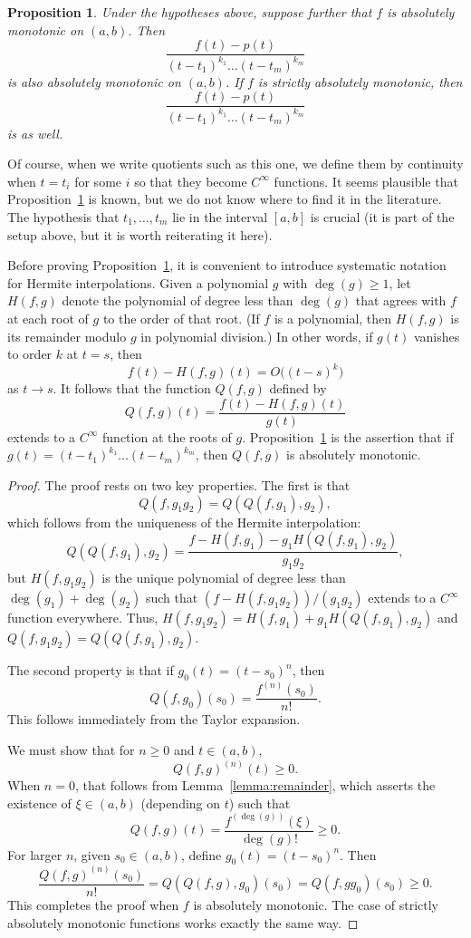 \documentclass{jams-l}
\theoremstyle{plain}
\newtheorem{proposition}[theorem]{Proposition}
\numberwithin{theorem}{section}
\theoremstyle{definition}
\numberwithin{equation}{section}
\begin{document}
\begin{proposition}\label{prop:absmonred}
Under the hypotheses above, suppose further that $f$ is absolutely
monotonic on $(a,b)$.  Then
$$
\frac{f(t)-p(t)}{(t-t_1)^{k_1}\dots (t-t_m)^{k_m}}
$$
is also absolutely monotonic on $(a,b)$.  If $f$ is strictly
absolutely monotonic, then
$$
\frac{f(t)-p(t)}{(t-t_1)^{k_1}\dots (t-t_m)^{k_m}}
$$
is as well.
\end{proposition}

Of course, when we write quotients such as this one, we define
them by continuity when $t = t_i$ for some $i$ so that they become
$C^\infty$ functions. It seems plausible that
Proposition~\ref{prop:absmonred} is known, but we do not know
where to find it in the literature. The hypothesis that
$t_1,\dots,t_m$ lie in the interval $[a,b]$ is crucial (it is part
of the setup above, but it is worth reiterating it here).

Before proving Proposition~\ref{prop:absmonred}, it is convenient
to introduce systematic notation for Hermite interpolations. Given
a polynomial $g$ with $\deg(g) \ge 1$, let $H(f,g)$ denote the
polynomial of degree less than $\deg(g)$ that agrees with $f$ at
each root of $g$ to the order of that root.  (If $f$ is a
polynomial, then $H(f,g)$ is its remainder modulo $g$ in
polynomial division.) In other words, if $g(t)$ vanishes to order
$k$ at $t=s$, then
$$
f(t) - H(f,g)(t) = O\big((t-s)^{k}\big)
$$
as $t \to s$.  It follows that the function $Q(f,g)$ defined by
$$
Q(f,g)(t) = \frac{f(t)-H(f,g)(t)}{g(t)}
$$
extends to a $C^\infty$ function at the roots of $g$.
Proposition~\ref{prop:absmonred} is the assertion that if
$g(t)=(t-t_1)^{k_1}\dots (t-t_m)^{k_m}$, then $Q(f,g)$ is
absolutely monotonic.

\begin{proof}
The proof rests on two key properties. The first is that
$$
Q(f,g_1g_2) = Q(Q(f,g_1),g_2),
$$
which follows from the uniqueness of the Hermite interpolation:
$$
Q(Q(f,g_1),g_2) = \frac{f-H(f,g_1)-g_1H(Q(f,g_1),g_2)}{g_1g_2},
$$
but $H(f,g_1g_2)$ is the unique polynomial of degree less than
$\deg(g_1)+\deg(g_2)$ such that $(f-H(f,g_1g_2))/(g_1g_2)$ extends
to a $C^\infty$ function everywhere.  Thus, $H(f,g_1g_2)
=H(f,g_1)+g_1H(Q(f,g_1),g_2)$ and $Q(f,g_1g_2) = Q(Q(f,g_1),g_2)$.

The second property is that if $g_0(t) = (t-s_0)^n$, then
$$
Q(f,g_0)(s_0) = \frac{f^{(n)}(s_0)}{n!}.
$$
This follows immediately from the Taylor expansion.

We must show that for $n \ge 0$ and $t \in (a,b)$,
$$
Q(f,g)^{(n)}(t) \ge 0.
$$
When $n=0$, that follows from Lemma~\ref{lemma:remainder}, which
asserts the existence of $\xi \in (a,b)$ (depending on $t$) such
that
$$
Q(f,g)(t) = \frac{f^{(\deg(g))}(\xi)}{\deg(g)!} \ge 0.
$$
For larger $n$, given $s_0 \in (a,b)$, define $g_0(t) = (t-s_0)^n$.
Then
$$
\frac{Q(f,g)^{(n)}(s_0)}{n!} = Q(Q(f,g),g_0)(s_0) = Q(f,gg_0)(s_0)
\ge 0.
$$
This completes the proof when $f$ is absolutely monotonic. The
case of strictly absolutely monotonic functions works exactly the
same way.
\end{proof}
\end{document}
